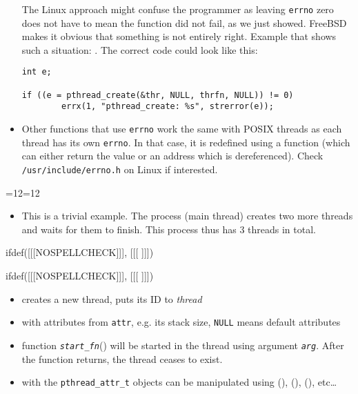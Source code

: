 \begin{itemize}
The Linux approach might confuse the programmer as leaving \texttt{errno} zero
does not have to mean the function did not fail, as we just showed.  FreeBSD
makes it obvious that something is not entirely right.  Example that shows such
a situation: . The correct code could look
like this:

\begin{verbatim}
int e;

if ((e = pthread_create(&thr, NULL, thrfn, NULL)) != 0)
        errx(1, "pthread_create: %s", strerror(e));
\end{verbatim}

\item {} Other functions that use \texttt{errno} work the
same with POSIX threads as each thread has its own \texttt{errno}.  In that
case, it is redefined using a function (which can either return the value or an
address which is dereferenced).  Check \texttt{/usr/include/errno.h} on Linux if
interested.
\end{itemize}


\begin{slide}
{=12=12
\begin{center}

\end{center}}
\end{slide}

\begin{itemize}
\item This is a trivial example.  The process (main thread) creates two more
threads and waits for them to finish.  This process thus has 3 threads in
total.
\end{itemize}


ifdef([[[NOSPELLCHECK]]], [[[
]]])

\begin{slide}
ifdef([[[NOSPELLCHECK]]], [[[
]]])
\begin{itemize}
\item creates a new thread, puts its ID to \emph{thread}
\item with attributes from \texttt{attr}, e.g. its stack size,
\texttt{NULL} means default attributes
\item function \emph{\texttt{start\_fn}}() will be started in the thread using
argument \emph{\texttt{arg}}. After the function returns, the thread ceases to
exist.
\item with the \texttt{pthread\_attr\_t} objects can be manipulated using
(), (),
(), etc\dots{}
\end{itemize}
\end{slide}

